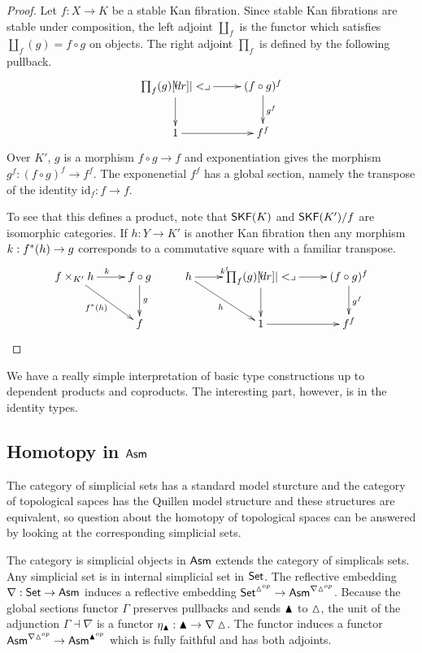 \documentclass{amsart}
\theoremstyle{plain}
\theoremstyle{definition}
\newcommand\hide[1]{}
\newcommand\id{\mathrm{id}}
\begin{document}
\begin{proof} Let $f:X\to K$ be a stable Kan fibration. Since stable Kan fibrations are stable under composition, the left adjoint $\coprod_f$ is the functor which satisfies $\coprod_f(g) = f\circ g$ on objects. The right adjoint $\prod_f$ is defined by the following pullback.
\[\xymatrix{
\prod_f(g)\ar[r]\ar[d]\pb & (f\circ g)^f \ar[d]^{g^f} \\
1 \ar[r] & f^f
}\]
Over $K'$, $g$ is a morphism $f\circ g \to f$ and exponentiation gives the morphism $g^f: (f\circ g)^f \to f^f$. The exponenetial $f^f$ has a global section, namely the transpose of the identity $\id_f:f\to f$.

To see that this defines a product, note that $\mathsf{SKF}(K)$ and $\mathsf{SKF}(K')/f$ are isomorphic categories. If $h:Y\to K'$ is another Kan fibration then any morphism $k:f^*(h) \to g$ corresponds to a commutative square with a familiar transpose.
\[ \xymatrix{
f\times_{K'} h\ar[dr]_{f\ri(h)}\ar[r]^k & f\circ g \ar[d]^g & h \ar[r]^{k^t}\ar[dr]_h & \prod_f(g)\ar[r]\ar[d]\pb & (f\circ g)^f \ar[d]^{g^f} \\
& f & & 1 \ar[r] & f^f
}\]

\end{proof}\hide{ Beck Chevalley is voor linksadjuncten triviaal, en dus ook geldig voor rechtadjuncten }

We have a really simple interpretation of basic type constructions up to dependent products and coproducts. The interesting part, however, is in the identity types.

\subsection{Homotopy in $\mathsf{Asm}$}
The category of simplicial sets has a standard model sturcture and the category of topological sapces has the Quillen model structure and these structures are equivalent, so question about the homotopy of topological spaces can be answered by looking at the corresponding simplicial sets.

The category is simplicial objects in $\mathsf{Asm}$ extends the category of simplicals sets. Any simplicial set is in internal simplicial set in $\mathsf{Set}$. The reflective embedding $\nabla:\mathsf{Set}\to \mathsf{Asm}$ induces a reflective embedding $\mathsf{Set}^{\vartriangle^{op}} \to \mathsf{Asm}^{\nabla\vartriangle^{op}}$. Because the global sections functor $\Gamma$ preserves pullbacks and sends $\blacktriangle$ to $\vartriangle$, the unit of the adjunction $\Gamma\dashv \nabla$ is a functor $\eta_{\blacktriangle}:\blacktriangle \to \nabla \vartriangle$. The functor induces a functor $\mathsf{Asm}^{\nabla\vartriangle^{op}} \to \mathsf{Asm}^{\blacktriangle^{op}}$ which is fully faithful and has both adjoints. 
\end{document}
